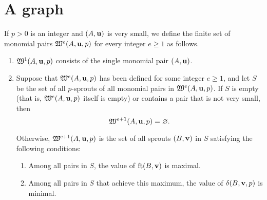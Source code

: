 \documentclass[11pt]{amsart}
\renewcommand{\!}[1]{{\color{red}\text{$\star$\,}#1\,$\star$}}
\begin{document}
\newpage





\section{A graph}



\begin{definition}  If $p>0$ is an integer and $(A, \mathbf{u})$ is very small, we define the finite set of monomial pairs $\mathfrak{W}^e(A, \mathbf{u}, p)$ for every integer $e \geq 1$ as follows.

\begin{enumerate}
\item $\mathfrak{W}^1(A, \mathbf{u}, p)$ consists of the single monomial pair $(A, \mathbf{u})$.
\item Suppose that $\mathfrak{W}^e(A, \mathbf{u}, p)$ has been defined for some integer $e \geq 1$, and let $S$ be the set of all $p$-sprouts of all monomial pairs in $\mathfrak{W}^e(A, \mathbf{u}, p)$.  If  $S$ is empty (that is, $\mathfrak{W}^e(A, \mathbf{u}, p)$ itself is empty) or contains a pair that is not very small, then \[ \mathfrak{W}^{e+1}(A, \mathbf{u}, p) = \varnothing.\]  

Otherwise, $\mathfrak{W}^{e+1}(A, \mathbf{u}, p)$ is the set of all sprouts $(B, \mathbf{v})$ in $S$ satisfying the following conditions:    

\begin{enumerate}
\item Among all pairs in $S$, the value of  $\operatorname{ft}(B, \mathbf{v})$ is maximal.
\item Among all pairs in $S$ that achieve this maximum, the value of $\delta(B, \mathbf{v}, p)$ is minimal.
\end{enumerate}
\end{enumerate}
\end{definition}
\end{document}
